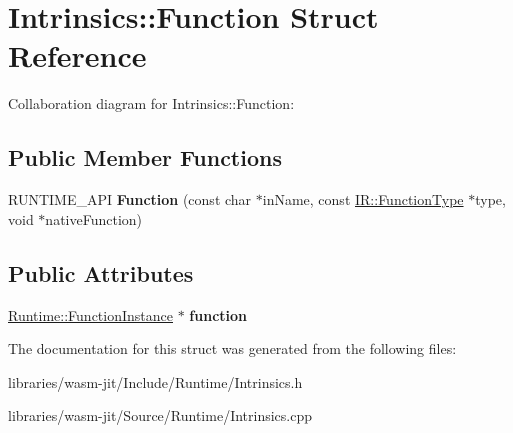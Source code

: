 \hypertarget{struct_intrinsics_1_1_function}{}\section{Intrinsics\+:\+:Function Struct Reference}
\label{struct_intrinsics_1_1_function}


Collaboration diagram for Intrinsics\+:\+:Function\+:
\subsection*{Public Member Functions}
\begin{DoxyCompactItemize}
\item 
\mbox{\label{struct_intrinsics_1_1_function_add6250b1384c61c30811f3e8e8eac39a}} 
R\+U\+N\+T\+I\+M\+E\+\_\+\+A\+PI {\bfseries Function} (const char $\ast$in\+Name, const \mbox{\hyperlink{struct_i_r_1_1_function_type}{I\+R\+::\+Function\+Type}} $\ast$type, void $\ast$native\+Function)
\end{DoxyCompactItemize}
\subsection*{Public Attributes}
\begin{DoxyCompactItemize}
\item 
\mbox{\label{struct_intrinsics_1_1_function_ae282783b6f14ad1b1c0301b6e0e957a8}} 
\mbox{\hyperlink{struct_runtime_1_1_function_instance}{Runtime\+::\+Function\+Instance}} $\ast$ {\bfseries function}
\end{DoxyCompactItemize}


The documentation for this struct was generated from the following files\+:\begin{DoxyCompactItemize}
\item 
libraries/wasm-\/jit/\+Include/\+Runtime/Intrinsics.\+h\item 
libraries/wasm-\/jit/\+Source/\+Runtime/Intrinsics.\+cpp\end{DoxyCompactItemize}
